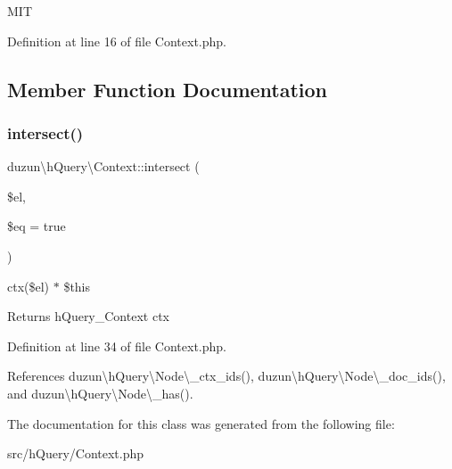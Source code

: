 M\+IT 

Definition at line 16 of file Context.\+php.



\subsection{Member Function Documentation}
\mbox{\label{classduzun_1_1hQuery_1_1Context_a8a3539a583a8e00f3bbd39b114b73542}} 
\subsubsection{\texorpdfstring{intersect()}{intersect()}}
{\footnotesize\ttfamily duzun\textbackslash{}h\+Query\textbackslash{}\+Context\+::intersect (\begin{DoxyParamCaption}\item[{}]{\$el,  }\item[{}]{\$eq = {\ttfamily true} }\end{DoxyParamCaption})}

ctx(\$el) $\ast$ \$this

\begin{DoxyReturn}{Returns}
h\+Query\+\_\+\+Context ctx 
\end{DoxyReturn}


Definition at line 34 of file Context.\+php.



References duzun\textbackslash{}h\+Query\textbackslash{}\+Node\textbackslash{}\+\_\+ctx\+\_\+ids(), duzun\textbackslash{}h\+Query\textbackslash{}\+Node\textbackslash{}\+\_\+doc\+\_\+ids(), and duzun\textbackslash{}h\+Query\textbackslash{}\+Node\textbackslash{}\+\_\+has().



The documentation for this class was generated from the following file\+:\begin{DoxyCompactItemize}
\item 
src/h\+Query/Context.\+php\end{DoxyCompactItemize}
